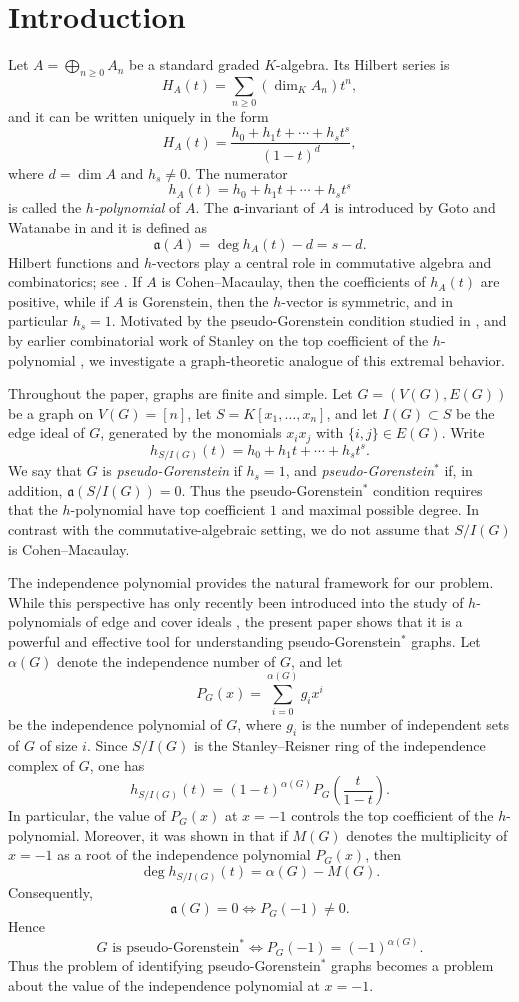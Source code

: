 \documentclass[12pt]{amsart}
\theoremstyle{plain}
\theoremstyle{definition}
\begin{document}
\section*{Introduction}

Let \(A=\bigoplus_{n\ge 0}A_n\) be a standard graded \(K\)-algebra. Its Hilbert series is
\[
H_A(t)=\sum_{n\ge 0}(\dim_K A_n)t^n,
\]
and it can be written uniquely in the form
\[
H_A(t)=\frac{h_0+h_1t+\cdots+h_st^s}{(1-t)^d},
\]
where \(d=\dim A\) and \(h_s\neq 0\). The numerator
\[
h_A(t)=h_0+h_1t+\cdots+h_st^s
\]
is called the \emph{\(h\)-polynomial} of \(A\). The \(\mathfrak a\)-invariant of \(A\) is introduced by Goto and Watanabe  in \cite{GW} and it is defined as
\[
\mathfrak a(A)=\deg h_A(t)-d=s-d.
\]
Hilbert functions and \(h\)-vectors play a central role in commutative algebra and combinatorics; see \cite{Sta78}. If \(A\) is Cohen--Macaulay, then the coefficients of \(h_A(t)\) are positive, while if \(A\) is Gorenstein, then the \(h\)-vector is symmetric, and in particular \(h_s=1\). Motivated by the pseudo-Gorenstein condition studied in \cite{EHHM}, and by earlier combinatorial work of Stanley on the top coefficient of the \(h\)-polynomial \cite{Sta72,Hibi,EC1}, we investigate a graph-theoretic analogue of this extremal behavior.

Throughout the paper, graphs are finite and simple. Let \(G = (V(G),E(G))\) be a graph on  \(V(G) =[n]\), let \(S=K[x_1,\dots,x_n]\), and let \(I(G)\subset S\) be the edge ideal of \(G\), generated by the monomials \(x_ix_j\) with \(\{i,j\}\in E(G)\). Write
\[
h_{S/I(G)}(t)=h_0+h_1t+\cdots+h_st^s.
\]
We say that \(G\) is \emph{pseudo-Gorenstein} if \(h_s=1\), and \emph{pseudo-Gorenstein\(^{*}\)} if, in addition, \(\mathfrak a(S/I(G))=0\). Thus the pseudo-Gorenstein\(^{*}\) condition requires that the \(h\)-polynomial have top coefficient \(1\) and maximal possible degree. In contrast with the commutative-algebraic setting, we do not assume that \(S/I(G)\) is Cohen--Macaulay.

The independence polynomial provides the natural framework for our problem. While this perspective has only recently been introduced into the study of $h$-polynomials of edge and cover ideals \cite{biermann2026}, the present paper shows that it is a powerful and effective tool for understanding pseudo-Gorenstein$^{*}$ graphs.  Let \(\alpha(G)\) denote the independence number of \(G\), and let
\[
P_G(x)=\sum_{i=0}^{\alpha(G)} g_i x^i
\]
be the independence polynomial of \(G\), where \(g_i\) is the number of independent sets of \(G\) of size \(i\). Since \(S/I(G)\) is the Stanley--Reisner ring of the independence complex of \(G\), one has
\[
h_{S/I(G)}(t)=(1-t)^{\alpha(G)}P_G\!\left(\frac{t}{1-t}\right).
\]
In particular, the value of $P_G(x)$ at \(x=-1\) controls the top coefficient of the \(h\)-polynomial. Moreover, it was shown in \cite{biermann2026} that if $M(G)$  denotes the multiplicity of $x=-1$ as a root of the independence polynomial $P_G(x)$,
then
\[
\deg h_{S/I(G)}(t)=\alpha(G)-M(G).
\]
Consequently,
\[
\mathfrak a(G)=0 \iff P_G(-1)\neq 0.
\]
Hence
\[
G \text{ is pseudo-Gorenstein}^{*}
\iff
P_G(-1)=(-1)^{\alpha(G)}.
\]
Thus the problem of identifying pseudo-Gorenstein\(^{*}\) graphs becomes a problem about the value  of the independence polynomial at $x=-1$.
\end{document}
